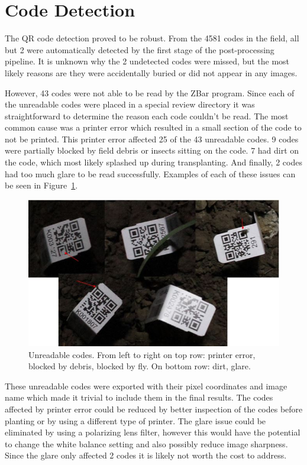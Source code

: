 \section{Code Detection}

The QR code detection proved to be robust. From the 4581 codes in the field, all but 2 were automatically detected by the first stage of the post-processing pipeline.  It is unknown why the 2 undetected codes were missed, but the most likely reasons are they were accidentally buried or did not appear in any images.  

However, 43 codes were not able to be read by the ZBar program.  Since each of the unreadable codes were placed in a special review directory it was straightforward to determine the reason each code couldn't be read.  The most common cause was a printer error which resulted in a small section of the code to not be printed.  This printer error affected 25 of the 43 unreadable codes.  9 codes were partially blocked by field debris or insects sitting on the code.  7 had dirt on the code, which most likely splashed up during transplanting. And finally, 2 codes had too much glare to be read successfully.  Examples of each of these issues can be seen in Figure~\ref{figure:missed_codes}. 

\begin{figure}
	\centering
    \includegraphics[width=5in]{figures/missed_codes.jpg}
    \caption[Unreadable QR codes]{Unreadable codes.  From left to right on top row: printer error, blocked by debris, blocked by fly. On bottom row: dirt, glare.}
    \label{figure:missed_codes}
\end{figure}

These unreadable codes were exported with their pixel coordinates and image name which made it trivial to include them in the final results. The codes affected by printer error could be reduced by better inspection of the codes before planting or by using a different type of printer.  The glare issue could be eliminated by using a polarizing lens filter, however this would have the potential to change the white balance setting and also possibly reduce image sharpness.  Since the glare only affected 2 codes it is likely not worth the cost to address.  

